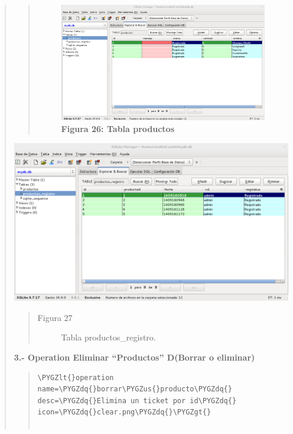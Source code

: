 \documentclass[letterpaper,11pt,spanish]{sphinxmanual}
\def\PYGZus{\char`\_}
\def\PYGZlt{\char`\<}
\def\PYGZgt{\char`\>}
\def\PYGZdq{\char`\"}
\begin{document}
\begin{quote}
\begin{itemize}
\begin{quote}
\begin{figure}[htbp]
\includegraphics{lista_producto3.png}
\caption{\textbf{Figura 26: Tabla productos}}\label{_templates/Contenido6/Parte2:figura1}\end{figure}
\end{quote}

{\hfill\includegraphics{lista_producto4.png}\hfill}
\begin{quote}\begin{description}
\item[{Figura 27}] \leavevmode
Tabla productos\_registro.

\end{description}\end{quote}

\end{itemize}

\textbf{3.- Operation Eliminar ``Productos'' D(Borrar o eliminar)}
\begin{quote}

\begin{Verbatim}[commandchars=\\\{\}]
\PYGZlt{}operation  name=\PYGZdq{}borrar\PYGZus{}producto\PYGZdq{}  desc=\PYGZdq{}Elimina un ticket por id\PYGZdq{} icon=\PYGZdq{}clear.png\PYGZdq{}\PYGZgt{}


\end{Verbatim}
\end{quote}
\end{quote}
\end{document}
